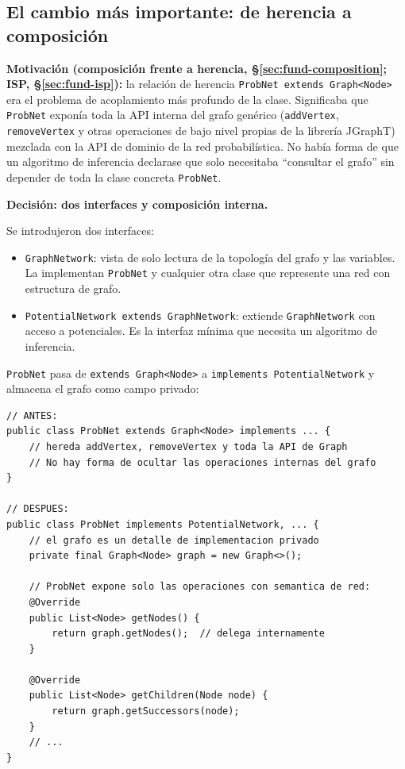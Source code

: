 \documentclass[11pt,a4paper]{article}
\newcommand{\code}[1]{\texttt{#1}}
\begin{document}
\subsection{El cambio más importante: de herencia a composición}
\label{sec:herencia-a-composicion}

\textbf{Motivación (composición frente a herencia, §\ref{sec:fund-composition};
ISP, §\ref{sec:fund-isp}):}
la relación de herencia \code{ProbNet extends Graph<Node>} era el
problema de acoplamiento más profundo de la clase.  Significaba que
\code{ProbNet} exponía toda la API interna del grafo genérico
(\code{addVertex}, \code{removeVertex} y otras operaciones de bajo nivel
propias de la librería JGraphT) mezclada con la API de dominio de la red
probabilística.  No había forma de que un algoritmo de inferencia
declarase que solo necesitaba ``consultar el grafo'' sin depender de
toda la clase concreta \code{ProbNet}.

\textbf{Decisión: dos interfaces y composición interna.}

Se introdujeron dos interfaces:

\begin{itemize}
  \item \code{GraphNetwork}: vista de solo lectura de la topología del
        grafo y las variables.  La implementan \code{ProbNet} y cualquier
        otra clase que represente una red con estructura de grafo.

  \item \code{PotentialNetwork extends GraphNetwork}: extiende
        \code{GraphNetwork} con acceso a potenciales.  Es la interfaz
        mínima que necesita un algoritmo de inferencia.
\end{itemize}

\code{ProbNet} pasa de \code{extends Graph<Node>} a \code{implements
PotentialNetwork} y almacena el grafo como campo privado:

\begin{lstlisting}[caption={Cambio de herencia a composición en \texttt{ProbNet}.},
                   label=lst:herencia-composicion]
// ANTES:
public class ProbNet extends Graph<Node> implements ... {
    // hereda addVertex, removeVertex y toda la API de Graph
    // No hay forma de ocultar las operaciones internas del grafo
}

// DESPUES:
public class ProbNet implements PotentialNetwork, ... {
    // el grafo es un detalle de implementacion privado
    private final Graph<Node> graph = new Graph<>();

    // ProbNet expone solo las operaciones con semantica de red:
    @Override
    public List<Node> getNodes() {
        return graph.getNodes();  // delega internamente
    }

    @Override
    public List<Node> getChildren(Node node) {
        return graph.getSuccessors(node);
    }
    // ...
}
\end{lstlisting}
\end{document}
